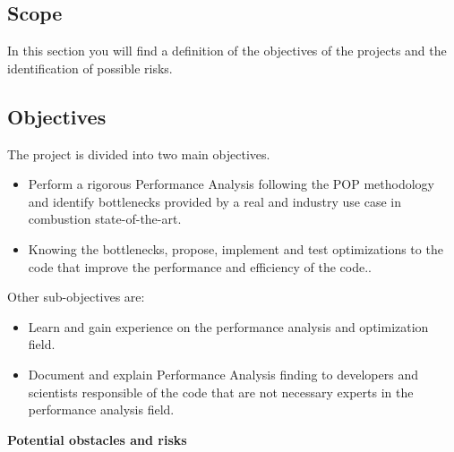 \subsection{Scope}
In this section you will find a definition of the objectives of the projects and the identification of possible risks.
\subsection{Objectives}\label{sec:objectives}

The project is divided into two main objectives.
\begin{itemize}
  \item Perform a rigorous Performance Analysis following the POP methodology and identify bottlenecks provided by a real and industry use case in combustion state-of-the-art.
  \item Knowing the bottlenecks, propose, implement and test optimizations to the code that improve the performance and efficiency of the code..
\end{itemize}

Other sub-objectives are:
\begin{itemize}
  \item Learn and gain experience on the performance analysis and optimization field.
  \item Document and explain Performance Analysis finding to developers and scientists responsible of the code that are not necessary experts in the performance analysis field.  
\end{itemize}

\textbf{Potential obstacles and risks}

